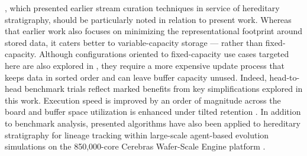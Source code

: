 \citet{moreno2024algorithms}, which presented earlier stream curation techniques in service of hereditary stratigraphy, should be particularly noted in relation to present work.
Whereas that earlier work also focuses on minimizing the representational footprint around stored data, it caters better to variable-capacity storage --- rather than fixed-capacity.
Although configurations oriented to fixed-capacity use cases targeted here are also explored in \citet{moreno2024algorithms}, they require a more expensive update process that keeps data in sorted order and can leave buffer capacity unused.
Indeed, head-to-head benchmark trials reflect marked benefits from key simplifications explored in this work.
Execution speed is improved by an order of magnitude across the board and buffer space utilization is enhanced under tilted retention \citep{moreno2024guide,moreno2024trackable}.
In addition to benchmark analysis, presented algorithms have also been applied to hereditary stratigraphy for lineage tracking within large-scale agent-based evolution simulations on the 850,000-core Cerebras Wafer-Scale Engine platform \citep{moreno2024trackable}.
